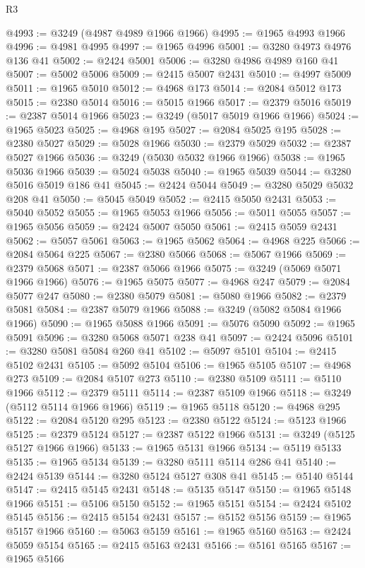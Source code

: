 \begin{lexlean}{R3}
\begin{coremodule}
@4993 := @3249 (@4987 @4989 @1966 @1966)
@4995 := @1965 @4993 @1966
@4996 := @4981 @4995
@4997 := @1965 @4996
@5001 := @3280 @4973 @4976 @136 @41
@5002 := @2424 @5001
@5006 := @3280 @4986 @4989 @160 @41
@5007 := @5002 @5006
@5009 := @2415 @5007 @2431
@5010 := @4997 @5009
@5011 := @1965 @5010
@5012 := @4968 @173
@5014 := @2084 @5012 @173
@5015 := @2380 @5014
@5016 := @5015 @1966
@5017 := @2379 @5016
@5019 := @2387 @5014 @1966
@5023 := @3249 (@5017 @5019 @1966 @1966)
@5024 := @1965 @5023
@5025 := @4968 @195
@5027 := @2084 @5025 @195
@5028 := @2380 @5027
@5029 := @5028 @1966
@5030 := @2379 @5029
@5032 := @2387 @5027 @1966
@5036 := @3249 (@5030 @5032 @1966 @1966)
@5038 := @1965 @5036 @1966
@5039 := @5024 @5038
@5040 := @1965 @5039
@5044 := @3280 @5016 @5019 @186 @41
@5045 := @2424 @5044
@5049 := @3280 @5029 @5032 @208 @41
@5050 := @5045 @5049
@5052 := @2415 @5050 @2431
@5053 := @5040 @5052
@5055 := @1965 @5053 @1966
@5056 := @5011 @5055
@5057 := @1965 @5056
@5059 := @2424 @5007 @5050
@5061 := @2415 @5059 @2431
@5062 := @5057 @5061
@5063 := @1965 @5062
@5064 := @4968 @225
@5066 := @2084 @5064 @225
@5067 := @2380 @5066
@5068 := @5067 @1966
@5069 := @2379 @5068
@5071 := @2387 @5066 @1966
@5075 := @3249 (@5069 @5071 @1966 @1966)
@5076 := @1965 @5075
@5077 := @4968 @247
@5079 := @2084 @5077 @247
@5080 := @2380 @5079
@5081 := @5080 @1966
@5082 := @2379 @5081
@5084 := @2387 @5079 @1966
@5088 := @3249 (@5082 @5084 @1966 @1966)
@5090 := @1965 @5088 @1966
@5091 := @5076 @5090
@5092 := @1965 @5091
@5096 := @3280 @5068 @5071 @238 @41
@5097 := @2424 @5096
@5101 := @3280 @5081 @5084 @260 @41
@5102 := @5097 @5101
@5104 := @2415 @5102 @2431
@5105 := @5092 @5104
@5106 := @1965 @5105
@5107 := @4968 @273
@5109 := @2084 @5107 @273
@5110 := @2380 @5109
@5111 := @5110 @1966
@5112 := @2379 @5111
@5114 := @2387 @5109 @1966
@5118 := @3249 (@5112 @5114 @1966 @1966)
@5119 := @1965 @5118
@5120 := @4968 @295
@5122 := @2084 @5120 @295
@5123 := @2380 @5122
@5124 := @5123 @1966
@5125 := @2379 @5124
@5127 := @2387 @5122 @1966
@5131 := @3249 (@5125 @5127 @1966 @1966)
@5133 := @1965 @5131 @1966
@5134 := @5119 @5133
@5135 := @1965 @5134
@5139 := @3280 @5111 @5114 @286 @41
@5140 := @2424 @5139
@5144 := @3280 @5124 @5127 @308 @41
@5145 := @5140 @5144
@5147 := @2415 @5145 @2431
@5148 := @5135 @5147
@5150 := @1965 @5148 @1966
@5151 := @5106 @5150
@5152 := @1965 @5151
@5154 := @2424 @5102 @5145
@5156 := @2415 @5154 @2431
@5157 := @5152 @5156
@5159 := @1965 @5157 @1966
@5160 := @5063 @5159
@5161 := @1965 @5160
@5163 := @2424 @5059 @5154
@5165 := @2415 @5163 @2431
@5166 := @5161 @5165
@5167 := @1965 @5166

\end{coremodule}
\end{lexlean}
